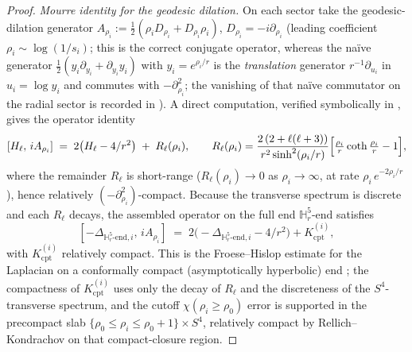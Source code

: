 \documentclass[11pt,letterpaper]{article}
\theoremstyle{definition}
\newcommand{\bbH}{\mathbb{H}}
\newcommand{\Lap}{\Delta}
\begin{document}
\begin{proof}
\smallskip
\noindent\emph{Mourre identity for the geodesic dilation.} On each sector take the geodesic-dilation generator $A_{\rho_i} := \tfrac12(\rho_i D_{\rho_i} + D_{\rho_i}\rho_i)$, $D_{\rho_i}=-i\partial_{\rho_i}$ (leading coefficient $\rho_i\sim\log(1/s_i)$; this is the correct conjugate operator, whereas the na\"ive generator $\tfrac12(y_i\partial_{y_i}+\partial_{y_i}y_i)$ with $y_i=e^{\rho_i/r}$ is the \emph{translation} generator $r^{-1}\partial_{u_i}$ in $u_i=\log y_i$ and commutes with $-\partial_{\rho_i}^2$; the vanishing of that na\"ive commutator on the radial sector is recorded in \cite{mourre-cusp-script}). A direct computation, verified symbolically in \cite{mourre-geodesic-script}, gives the operator identity
\begin{equation}\label{eq:Hconj-mourre}
[H_\ell,\, iA_{\rho_i}] \;=\; 2\bigl(H_\ell - 4/r^2\bigr) \;+\; R_\ell(\rho_i),\qquad
R_\ell(\rho_i) = \frac{2\,(2+\ell(\ell+3))}{r^2\sinh^2(\rho_i/r)}\Bigl[\tfrac{\rho_i}{r}\coth\tfrac{\rho_i}{r} - 1\Bigr],
\end{equation}
where the remainder $R_\ell$ is short-range ($R_\ell(\rho_i)\to 0$ as $\rho_i\to\infty$, at rate $\rho_i\,e^{-2\rho_i/r}$), hence relatively $(-\partial_{\rho_i}^2)$-compact. Because the transverse spectrum is discrete and each $R_\ell$ decays, the assembled operator on the full end $\bbH^5_r\text{-end}$ satisfies
\begin{equation}\label{eq:cusp-mourre}
[-\Lap_{\bbH^5_r\text{-end},i},\,iA_{\rho_i}] \;=\; 2\bigl(-\Lap_{\bbH^5_r\text{-end},i} - 4/r^2\bigr) + K^{(i)}_{\mathrm{cpt}},
\end{equation}
with $K^{(i)}_{\mathrm{cpt}}$ relatively compact. This is the Froese--Hislop estimate for the Laplacian on a conformally compact (asymptotically hyperbolic) end \cite{FroeseHislop1989}; the compactness of $K^{(i)}_{\mathrm{cpt}}$ uses only the decay of $R_\ell$ and the discreteness of the $S^4$-transverse spectrum, and the cutoff $\chi(\rho_i\ge\rho_0)$ error is supported in the precompact slab $\{\rho_0\le\rho_i\le\rho_0+1\}\times S^4$, relatively compact by Rellich--Kondrachov on that compact-closure region.


\end{proof}
\end{document}
